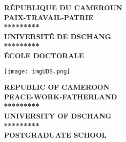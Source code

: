 \hspace{1.3cm}\parbox[b]{0.5\textwidth}{
\centering
\textsc{\textbf{\MakeTextUppercase R\'EPUBLIQUE DU CAMEROUN}}\\
\textsc{\textbf{\MakeTextUppercase PAIX-TRAVAIL-PATRIE}}\\
\textsc{\textbf{*********}} \\
\textsc{\textbf{\MakeTextUppercase UNIVERSIT\'E DE DSCHANG}}\\
\textsc{\textbf{*********}} \\
\textsc{\textbf{\'ECOLE DOCTORALE}} \\

\vfill
}

\parbox[c]{0.1\textwidth}{
\hfill \texttt{[image: imgUDS.png]} \hfill
}

\parbox[b]{0.5\textwidth}{
\centering
\textsc{\textbf{\MakeTextUppercase REPUBLIC OF CAMEROON}}\\
\textsc{\textbf{\MakeTextUppercase PEACE-WORK-FATHERLAND}}\\
\textsc{\textbf{*********}} \\
\textbf{\scshape\MakeTextUppercase UNIVERSITY OF DSCHANG}\\
\textsc{\textbf{*********}} \\
\textsc{\textbf{POSTGRADUATE SCHOOL}} \\

\vfill
}
\hspace{1.7cm}